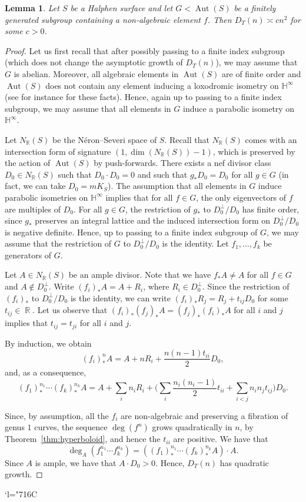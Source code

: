 \documentclass[11pt]{article}
\numberwithin{equation}{section}
\newcommand{\Changelback}{\mathcode`l="716C}
\newcommand{\h}{\operatorname{\mathbb{H}^{\infty}}}
\newcommand{\R}{\operatorname{\mathbb{R}}}
\newcommand{\Aut}{\operatorname{Aut}}
\theoremstyle{plain}
\newtheorem{lemma}[theorem]{Lemma}
\theoremstyle{definition}
\begin{document}
\begin{lemma}\label{lem:halphen}
Let $S$ be a Halphen surface and let $G<\Aut(S)$ be a finitely generated subgroup containing a non-algebraic element $f$. Then $D_T(n)\asymp cn^2$ for some $c>0$.
\end{lemma}

\begin{proof}
Let us first recall that after possibly passing to a finite index subgroup (which does not change the asymptotic growth of $D_T(n)$), we may assume that $G$ is abelian. Moreover, all algebraic elements in $\Aut(S)$ are of finite order and $\Aut(S)$ does not contain any element inducing a loxodromic isometry on $\h$ (see for instance \cite{cantat2015cremona} for these facts). Hence, again up to passing to a finite index subgroup, we may assume that all elements in $G$ induce a parabolic isometry on~$\h$.

Let $N_{\mathbb{R}}(S)$ be the Néron--Severi space of $S$. Recall that $N_{\mathbb{R}}(S)$ comes with an intersection form of signature $(1,\dim(N_{\mathbb{R}}(S))-1)$, which is preserved by the action of $\Aut(S)$ by push-forwards. There exists a nef divisor class $D_0\in N_{\mathbb{R}}(S)$ such that $D_0\cdot D_0=0$ and such that $g_*D_0=D_0$ for all $g\in G$ (in fact, we can take $D_0=mK_S$). The assumption that all elements in $G$ induce parabolic isometries on $\h$ implies that for all $f\in G$, the only eigenvectors of $f$ are multiples of $D_0$. For all $g\in G$, the restriction of $g_*$ to $D_0^\perp/D_0$ has finite order, since $g_*$ preserves an integral lattice and the induced intersection form on $D_0^\perp/D_0$ is negative definite. Hence, up to passing to a finite index subgroup of $G$, we may assume that the restriction of $G$ to $D_0^\perp/D_0$ is the identity. Let $f_1,\dots, f_k$ be generators of $G$.

Let $A\in N_{\mathbb{R}}(S)$ be an ample divisor. Note that we have $f_*A\neq A$ for all $f\in G$ and $A\notin D_0^\perp$. Write $(f_i)_*A=A+R_i$, where $R_i\in D_0^\perp$. Since the restriction of $(f_i)_*$ to $D_0^\perp/D_0$ is the identity, we can write $(f_i)_*R_j=R_j+t_{ij}D_0$ for some $t_{ij}\in\R$. Let us observe that $(f_i)_*(f_j)_*A=(f_j)_*(f_i)_*A$ for all $i$ and $j$ implies that $t_{ij}=t_{ji}$ for all $i$ and $j$.

By induction, we obtain\vspace*{-3pt}
\[
(f_i)^n_*A=A+nR_i+\frac{n(n-1)t_{ii}}{2}D_0,
\]
and, as a consequence,\vspace*{-3pt}
\[
(f_1)^{n_1}_*\cdots (f_k)^{n_k}_*A=A+\sum_in_iR_i+\biggl(\sum_i\frac{n_i(n_i-1)}{2}t_{ii}+\sum_{i<j}n_in_jt_{ij}\biggr)D_0.
\]

Since, by assumption, all the $f_i$ are non-algebraic and preserving a fibration of genus $1$ curves, the sequence $\deg(f^n)$ grows quadratically in $n$, by Theorem~\ref{thm:hyperboloid}, and hence the $t_{ii}$ are positive. We have that
\[
\deg_A(f_1^{n_1}\cdots f_k^{n_k})=((f_1)^{n_1}_*\cdots (f_k)^{n_k}_*A)\cdot A.
\]
Since $A$ is ample, we have that $A\cdot D_0>0$. Hence, $D_T(n)$ has quadratic growth.
\end{proof}
\Changelback
\end{document}

